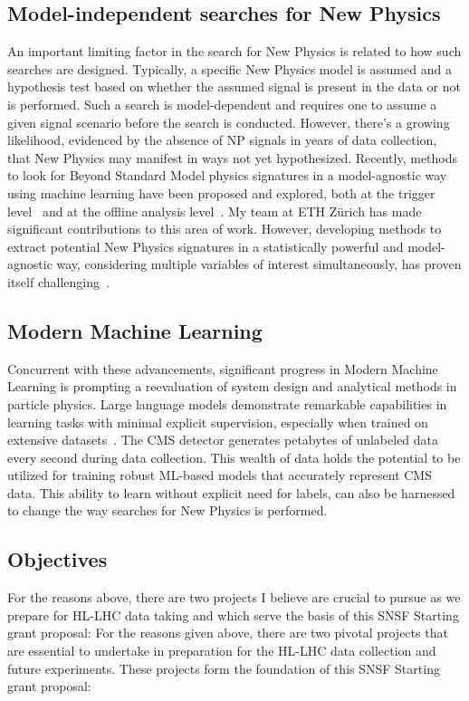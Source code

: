 \documentclass[12pt]{iopart}
\begin{document}
\subsection{Model-independent searches for New Physics}
An important limiting factor in the search for New Physics is related to how such searches are designed. Typically, a specific New Physics model is assumed and a hypothesis test based on whether the assumed signal is present in the data or not is performed. Such a search is model-dependent and requires one to assume a given signal scenario before the search is conducted. However, there's a growing likelihood, evidenced by the absence of NP signals in years of data collection, that New Physics may manifest in ways not yet hypothesized. Recently, methods to look for Beyond Standard Model physics signatures in a model-agnostic way using machine learning have been proposed and explored, both at the trigger level~\cite{CMS-DP-2023-079,BELIS2024100091} and at the offline analysis level~\cite{Harris:2881089,BELIS2024100091}. My team at ETH Zürich has made significant contributions to this area of work. However, developing methods to extract potential New Physics signatures in a statistically powerful and model-agnostic way, considering multiple variables of interest simultaneously, has proven itself challenging~\cite{D_Agnolo_2019}.

\subsection{Modern Machine Learning}
Concurrent with these advancements, significant progress in Modern Machine Learning is prompting a reevaluation of system design and analytical methods in particle physics. Large language models demonstrate remarkable capabilities in learning tasks with minimal explicit supervision, especially when trained on extensive datasets~\cite{Radford2019LanguageMA,brown2020language}. The CMS detector generates petabytes of unlabeled data every second during data collection. This wealth of data holds the potential to be utilized for training robust ML-based models that accurately represent CMS data. This ability to learn without explicit need for labels, can also be harnessed to change the way searches for New Physics is performed.

\subsection{Objectives}
For the reasons above, there are two projects I believe are crucial to pursue as we prepare for HL-LHC data taking and which serve the basis of this SNSF Starting grant proposal:
For the reasons given above, there are two pivotal projects that are essential to undertake in preparation for the HL-LHC data collection and future experiments. These projects form the foundation of this SNSF Starting grant proposal:
\end{document}
